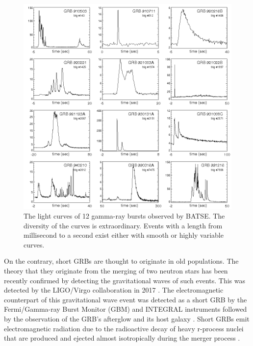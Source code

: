 \documentclass[12pt, a4paper,titlepage]{article}
\numberwithin{equation}{section}
\numberwithin{figure}{section}
\begin{document}
\begin{figure}[H]
\centering
\includegraphics[width=130.0mm]{images/GRB_BATSE_12lightcurves.png}
\caption{The light curves of 12 gamma-ray bursts observed by BATSE. The diversity of the curves is extraordinary. Events with a length from millisecond to a second exist either with smooth or highly variable curves.}
\end{figure}

On the contrary, short GRBs are thought to originate in old populations. The theory that they originate from the merging of two neutron stars has been recently confirmed by detecting the gravitational waves of such events. This was detected by the LIGO/Virgo collaboration in 2017 \cite{gravwave}. The electromagnetic counterpart of this gravitational wave event was detected as a short GRB by the Fermi/Gamma-ray Burst Monitor (GBM) and INTEGRAL instruments followed by the observation of the GRB’s afterglow and its host galaxy \cite{grb17}. Short GRBs emit electromagnetic radiation due to the radioactive decay of heavy r-process nuclei that are produced and ejected almost isotropically during the merger process \cite{grb18}.
\end{document}
